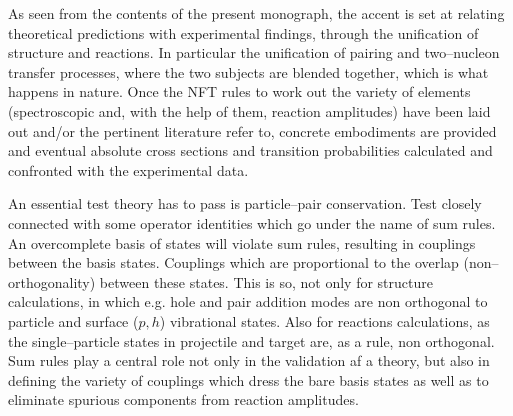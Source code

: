 As  seen from the contents of the present monograph, the accent is set at relating theoretical predictions with experimental findings, through the unification of structure and reactions. In particular the unification of pairing and two--nucleon transfer processes, where the two subjects are blended together, which is what happens in nature.  Once the NFT rules to work out the variety of elements (spectroscopic and, with the help of them, reaction amplitudes) have been laid  out and/or the pertinent literature refer to, concrete embodiments are provided and eventual absolute cross sections and transition probabilities calculated and confronted with the experimental data. 

An essential test theory has to pass is particle--pair conservation. Test closely connected with some operator identities which go under the name of sum rules. An overcomplete basis of states will violate sum rules, resulting in couplings between the basis states. Couplings which are proportional to the overlap (non--orthogonality) between these states.
This is so, not only  for structure calculations, in which e.g. hole and pair addition modes are non orthogonal to particle and surface ($p,h$) vibrational states. Also for reactions calculations, as the single--particle states in projectile and target are, as a rule, non orthogonal.  Sum rules play a central role not only in the validation af a theory, but also in defining the variety of couplings which dress the bare basis states as well as to eliminate spurious components from reaction amplitudes.




